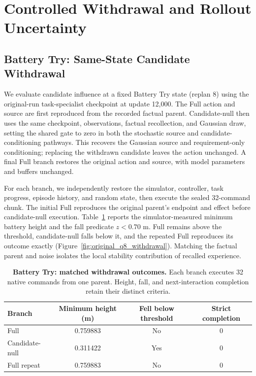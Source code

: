 \section{Controlled Withdrawal and Rollout Uncertainty}
\label{app:supplementary_fixed}
\subsection{Battery Try: Same-State Candidate Withdrawal}
\label{app:original_q8_withdrawal}
We evaluate candidate influence at a fixed Battery Try state (replan 8) using the original-run task-specialist checkpoint at update 12,000.
The Full action and source are first reproduced from the recorded factual parent. Candidate-null then uses the same checkpoint, observations, factual recollection, and Gaussian draw, setting the shared gate to zero in both the stochastic source and candidate-conditioning pathways.
This recovers the Gaussian source and requirement-only conditioning; replacing the withdrawn candidate leaves the action unchanged. A final Full branch restores the original action and source, with model parameters and buffers unchanged.

For each branch, we independently restore the simulator, controller, task progress, episode history, and random state, then execute the sealed 32-command chunk.
The initial Full reproduces the original parent's endpoint and effect before candidate-null execution.
Table~\ref{tab:original_q8_withdrawal} reports the simulator-measured minimum battery height and the fall predicate $z<0.70$ m.
Full remains above the threshold, candidate-null falls below it, and the repeated Full reproduces its outcome exactly (Figure~\ref{fig:original_q8_withdrawal}).
Matching the factual parent and noise isolates the local stability contribution of recalled experience.

\begin{table}[htbp]
\centering\small
\caption{\textbf{Battery Try: matched withdrawal outcomes.} Each branch executes 32 native commands from one parent. Height, fall, and next-interaction completion retain their distinct criteria.}
\label{tab:original_q8_withdrawal}
\begin{tabularx}{\linewidth}{@{}Xccc@{}}\toprule
Branch & Minimum height (m) & Fell below threshold & Strict completion\\\midrule
Full & 0.759883 & No & 0\\
Candidate-null & 0.311422 & Yes & 0\\
Full repeat & 0.759883 & No & 0\\\bottomrule
\end{tabularx}
\end{table}

